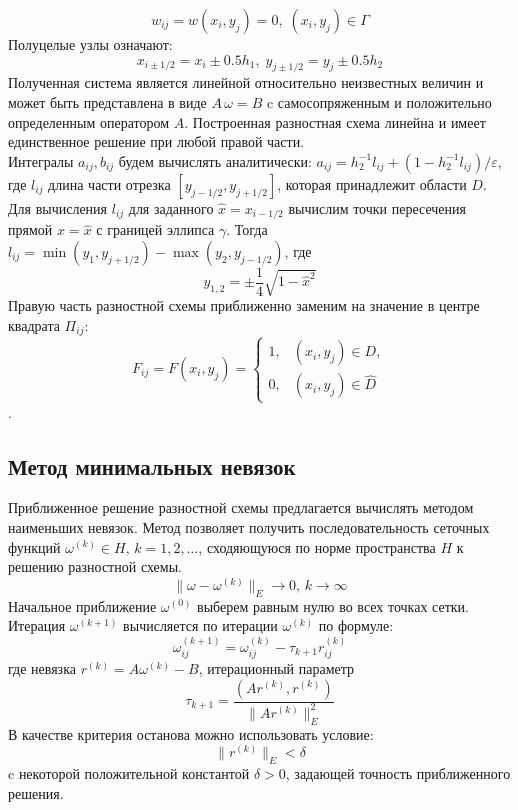 \documentclass[oneside,final,14pt]{extreport}
\begin{document}
\[ w_{ij} = w(x_i, y_j ) = 0, \; (x_i, y_j ) \in \Gamma \]
Полуцелые узлы означают:
\[ x_{i \pm 1/2} = x_i \pm 0.5h_1, \; y_{j \pm 1/2} = y_j \pm 0.5h_2 \]
Полученная система является линейной относительно неизвестных величин
и может быть представлена в виде \( A \, \omega = B \)
c самосопряженным и положительно определенным оператором \( A \).
Построенная разностная схема линейна и имеет
единственное решение при любой правой части.\\
\noindent
Интегралы \( a_{ij}, b_{ij} \) будем вычислять аналитически:
\( a_{ij} = h_2^{-1} l_{ij} + (1 - h_2^{-1} l_{ij}) / \varepsilon \),
где \( l_{ij} \) длина части отрезка \( [y_{j-1/2}, y_{j+1/2}] \), которая
принадлежит области \( D \).
Для вычисления \( l_{ij} \) для заданного \( \hat x = x_{i-1/2} \)
вычислим точки пересечения прямой \( x = \hat x \) с границей 
эллипса \( \gamma \). Тогда \( l_{ij} = \min(y_1, y_{j+1/2}) - \max(y_2, y_{j-1/2}) \), где
\[ y_{1,2} = \pm \frac{1}{4}\sqrt{1 - \hat x^2} \]
Правую часть разностной схемы приближенно заменим на значение
в центре квадрата \( \Pi_{ij} \): 
\[ F_{ij} = F(x_i,y_j) =  \begin{cases}
    1,   & (x_i, y_j) \in D, \\
    0,   & (x_i, y_j) \in \hat D
\end{cases} \].
\subsection{Метод минимальных невязок}
\noindent
Приближенное решение разностной схемы предлагается вычислять методом
наименьших невязок.
Метод позволяет получить последовательность сеточных функций
\( \omega^{(k)} \in H, \, k = 1,2,\ldots \), сходяющуюся по норме пространства
\( H \) к решению разностной схемы.
\[ \| \omega - \omega^{(k)} \|_E \rightarrow 0, \, k \rightarrow \infty \]
Начальное приближение \( \omega^{(0)} \) выберем равным нулю во всех
точках сетки. Итерация \( \omega^{(k+1)} \) вычисляется по итерации
\( \omega^{(k)} \) по формуле:
\[ \omega_{ij}^{(k+1)} = \omega_{ij}^{(k)} - \tau_{k+1} r_{ij}^{(k)} \]
где невязка \( r^{(k)} = A \omega^{(k)} - B \), итерационный параметр
\[ \tau_{k+1} = \frac{(A r^{(k)}, r^{(k)})}{\|A r^{(k)}\|^2_E} \]
В качестве критерия останова можно использовать условие:
\[ \| r^{(k)} \|_E < \delta \]
c некоторой положительной константой \( \delta > 0 \), задающей точность
приближенного решения.
\newpage
\end{document}
